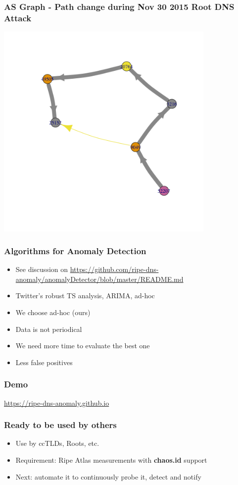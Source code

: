 \documentclass[serif]{beamer}
\begin{document}
\begin{frame}[fragile]
	\frametitle{AS Graph - Path change during Nov 30 2015 Root DNS Attack}
	\includegraphics[width=0.8\textwidth]{fig/10274.png}
\end{frame}

\begin{frame}[fragile]
	\frametitle{Algorithms for Anomaly Detection}
	\begin{itemize}
	 \item See discussion on 
\url{https://github.com/ripe-dns-anomaly/anomalyDetector/blob/master/README.md}
	\item Twitter's robust TS analysis, ARIMA, ad-hoc
	\item We choose ad-hoc (ours)
	\item Data is not periodical
	\item We need more time to evaluate the best one
	\item Less false positives
	\end{itemize}


\end{frame}


\begin{frame}[fragile]
	\frametitle{Demo}
	
	\large
	\url{https://ripe-dns-anomaly.github.io}

\end{frame}


\begin{frame}[fragile]
	\frametitle{Ready to be used by others}
\begin{itemize}
 \item Use by ccTLDs, Roots, etc.
 \item Requirement: Ripe Atlas measurements with \textbf{chaos.id} support
 \item Next: automate it to continuously probe it, detect and notify
\end{itemize}

\end{frame}
\end{document}
